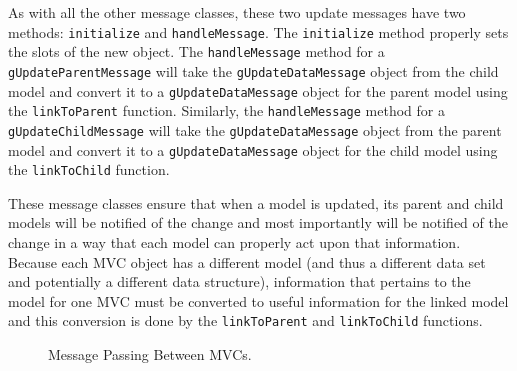 \documentclass{article}[11pt]
\newcommand{\Rfunction}[1]{{\texttt{#1}}}
\newcommand{\Robject}[1]{{\texttt{#1}}}
\begin{document}
As with all the other message classes, these two update messages have two
methods: \Rfunction{initialize} and \Rfunction{handleMessage}.  The
\Rfunction{initialize} method properly sets the slots of the new object.  The
\Rfunction{handleMessage} method for a \Robject{gUpdateParentMessage} will
take the \Robject{gUpdateDataMessage} object from the child model and convert
it to a \Robject{gUpdateDataMessage} object for the parent model using the
\Rfunction{linkToParent} function.  Similarly, the \Rfunction{handleMessage}
method for a \Robject{gUpdateChildMessage} will take the
\Robject{gUpdateDataMessage} object from the parent model and convert it to a
\Robject{gUpdateDataMessage} object for the child model using the
\Rfunction{linkToChild} function.  

These message classes ensure that when a model is updated, its parent and
child models will be notified of the change and most importantly will be
notified of the change in a way that each model can properly act upon that
information.  Because each MVC object has a different model (and thus a
different data set and potentially a different data structure), information
that pertains to the model for one MVC must be converted to useful information
for the linked model and this conversion is done by the
\Rfunction{linkToParent} and \Rfunction{linkToChild} functions.   

\begin{figure}[ht]
  \begin{center}
    \caption{ Message Passing Between MVCs. }
    \label{Fig:MessPass}
  \end{center}
\end{figure}
\end{document}
